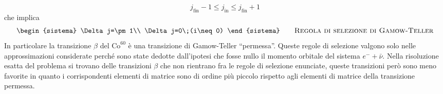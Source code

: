 \[
 j_{\text{fin}}-1\leq j_{\text{in}}\leq j_{\text{fin}}+1
\]
che implica
\[
\begin{sistema}
\Delta j=\pm1\\
\Delta j=0\;(i\neq0)
\end{sistema}\qquad\text{\textsc{Regola di selezione di Gamow-Teller}}
\]
In particolare la transizione $\beta$ del $\text{Co}^{60}$ è una transizione di
Gamow-Teller ``permessa''. Queste regole di selezione valgono solo nelle approssimazioni considerate
perché sono state dedotte dall'ipotesi che fosse nullo il momento orbitale del
sistema $e^-+\bar{\nu}$. Nella risoluzione esatta del problema si trovano delle transizioni $\beta$ che
non rientrano fra le regole di selezione enunciate, queste transizioni però sono
meno favorite in quanto i corrispondenti elementi di matrice sono di ordine più
piccolo rispetto
agli elementi di matrice della transizione permessa.

